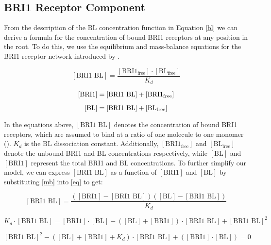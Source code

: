 \subsection{BRI1 Receptor Component}

From the description of the BL concentration function in Equation \eqref{bl} we can derive a formula for the concentration of bound BRI1 receptors at any position in the root. To do this, we use the equilibrium and mass-balance equations for the BRI1 receptor network introduced by \cite{vanesse2012}.

\begin{equation}
    \label{eq}
    [\text{BRI1 BL}] = \frac{[\text{BRI1}_{\text{free}}] \cdot [\text{BL}_{\text{free}}]}{K_{d}}
\end{equation}

\begin{equation}
    \label{mb}
\begin{aligned}
    \relax
    [\text{BRI1}] &= [\text{BRI1 BL}] + [\text{BRI1}_{\text{free}}]\\[5pt]
    [\text{BL}] &= [\text{BRI1 BL}] + [\text{BL}_{\text{free}}]
\end{aligned}
\end{equation}

In the equations above, $[\text{BRI1 BL}]$ denotes the concentration of bound BRI1 receptors, which are assumed to bind at a ratio of one molecule to one monomer (\cite{vanesse2012}). $K_{d}$ is the BL dissociation constant. Additionally, $[\text{BRI1}_{\text{free}}]$ and $[\text{BL}_{\text{free}}]$ denote the unbound BRI1 and BL concentrations respectively, while $[\text{BL}]$ and $[\text{BRI1}]$ represent the total BRI1 and BL concentrations. To further simplify our model, we can express $[\text{BRI1 BL}]$ as a function of $[\text{BRI1}]$ and $[\text{BL}]$ by substituting \eqref{mb} into \eqref{eq} to get:


\begin{equation}
\label{bri1-1}
[\text{BRI1 BL}] = \frac{([\text{BRI1}] - [\text{BRI1 BL}])([\text{BL}] - [\text{BRI1 BL}])}{K_{d}}
\end{equation}

\begin{equation}
\label{bri1-2}
K_{d} \cdot [\text{BRI1 BL}] = [\text{BRI1}] \cdot [\text{BL}] - ([\text{BL}] + [\text{BRI1}]) \cdot [\text{BRI1 BL}] + [\text{BRI1 BL}]^{2}
\end{equation}

\begin{equation}
\label{bri1-3}
[\text{BRI1 BL}]^{2} - ([\text{BL}] + [\text{BRI1}] + K_{d}) \cdot [\text{BRI1 BL}] + ([\text{BRI1}] \cdot [\text{BL}]) = 0
\end{equation}

